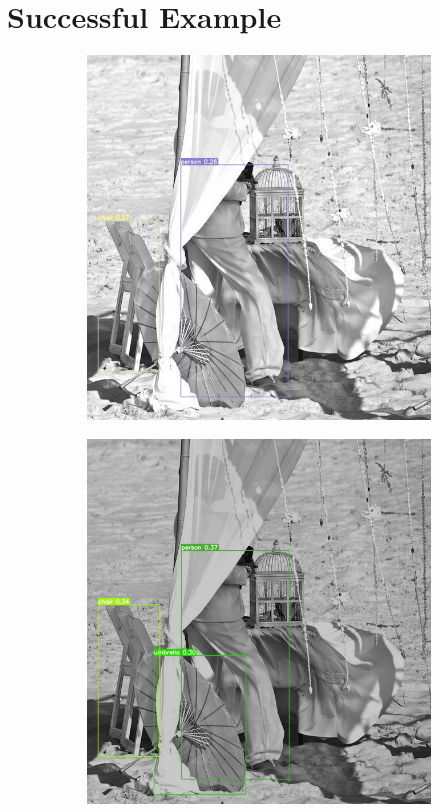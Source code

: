 \documentclass{PHlab-thesis}
\begin{document}
\section{Successful Example}
\begin{figure}[H]
    \centering
    \begin{subfigure}{0.45\textwidth}
        \centering
        \includegraphics[width=\textwidth]{images/instances/original_image_1.png}
    \end{subfigure}
    \quad
    \begin{subfigure}{0.45\textwidth}
        \centering
        \includegraphics[width=\textwidth]{images/instances/adjusted_image_1.png}
    \end{subfigure}


\end{figure}
\end{document}
